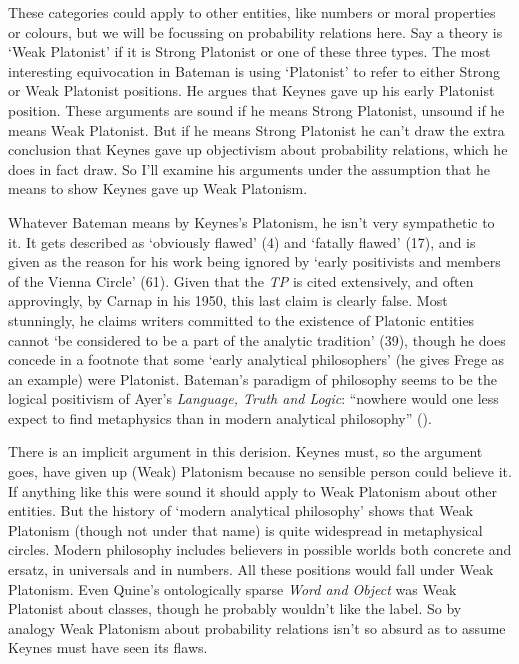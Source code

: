 \documentclass[
  11pt,
  letterpaper,
  DIV=11,
  numbers=noendperiod,
  twoside]{scrartcl}
\begin{document}
These categories could apply to other entities, like numbers or moral
properties or colours, but we will be focussing on probability relations
here. Say a theory is `Weak Platonist' if it is Strong Platonist or one
of these three types. The most interesting equivocation in Bateman is
using `Platonist' to refer to either Strong or Weak Platonist positions.
He argues that Keynes gave up his early Platonist position. These
arguments are sound if he means Strong Platonist, unsound if he means
Weak Platonist. But if he means Strong Platonist he can't draw the extra
conclusion that Keynes gave up objectivism about probability relations,
which he does in fact draw. So I'll examine his arguments under the
assumption that he means to show Keynes gave up Weak Platonism.

Whatever Bateman means by Keynes's Platonism, he isn't very sympathetic
to it. It gets described as `obviously flawed' (4) and `fatally flawed'
(17), and is given as the reason for his work being ignored by `early
positivists and members of the Vienna Circle' (61). Given that the
\emph{TP} is cited extensively, and often approvingly, by Carnap in his
1950, this last claim is clearly false. Most stunningly, he claims
writers committed to the existence of Platonic entities cannot `be
considered to be a part of the analytic tradition' (39), though he does
concede in a footnote that some `early analytical philosophers' (he
gives Frege as an example) were Platonist. Bateman's paradigm of
philosophy seems to be the logical positivism of Ayer's \emph{Language,
Truth and Logic}: ``nowhere would one less expect to find metaphysics
than in modern analytical philosophy'' ().

There is an implicit argument in this derision. Keynes must, so the
argument goes, have given up (Weak) Platonism because no sensible person
could believe it. If anything like this were sound it should apply to
Weak Platonism about other entities. But the history of `modern
analytical philosophy' shows that Weak Platonism (though not under that
name) is quite widespread in metaphysical circles. Modern philosophy
includes believers in possible worlds both concrete and ersatz, in
universals and in numbers. All these positions would fall under Weak
Platonism. Even Quine's ontologically sparse \emph{Word and Object} was
Weak Platonist about classes, though he probably wouldn't like the
label. So by analogy Weak Platonism about probability relations isn't so
absurd as to assume Keynes must have seen its flaws.
\end{document}

